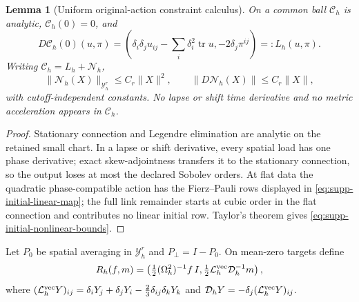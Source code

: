 \documentclass[11pt]{article}
\numberwithin{equation}{section}
\newtheorem{lemma}[lemma]{Lemma}
\theoremstyle{definition}
\theoremstyle{remark}
\newcommand{\tr}{\operatorname{tr}}
\begin{document}
\begin{lemma}[Uniform original-action constraint calculus]
\label{lem:supp-initial-calculus}
On a common ball $\mathscr C_h$ is analytic, $\mathscr C_h(0)=0$, and
\begin{equation}
 D\mathscr C_h(0)(u,\pi)=
 \left(\delta_i\delta_j u_{ij}-\sum_i\delta_i^2\tr u,
                         -2\delta_j\pi^{ij}\right)=:L_h(u,\pi).
 \label{eq:supp-initial-linear-map}
\end{equation}
Writing $\mathscr C_h=L_h+\mathscr N_h$,
\begin{equation}
 \|\mathscr N_h(X)\|_{\mathcal Y_h^r}\le C_r\|X\|^2,
 \qquad \|D\mathscr N_h(X)\|\le C_r\|X\|,
 \label{eq:supp-initial-nonlinear-bounds}
\end{equation}
with cutoff-independent constants.  No lapse or shift time derivative and no
metric acceleration appears in $\mathscr C_h$.
\end{lemma}
\begin{proof}
Stationary connection and Legendre elimination are analytic on the retained
small chart.  In a lapse or shift derivative, every spatial load has one phase
derivative; exact skew-adjointness transfers it to the stationary connection,
so the output loses at most the declared Sobolev orders.  At flat data the
quadratic phase-compatible action has the Fierz--Pauli rows displayed in
\eqref{eq:supp-initial-linear-map}; the full link remainder starts at cubic
order in the flat connection and contributes no linear initial row.  Taylor's
theorem gives \eqref{eq:supp-initial-nonlinear-bounds}.
\end{proof}

Let $P_0$ be spatial averaging in $\mathcal Y_h^r$ and
$P_\perp=I-P_0$.  On mean-zero targets define
\begin{equation}
 R_h(f,m)=\left(\tfrac12(\Omega_h^2)^{-1}f\,I,
  \tfrac12\mathcal L_h^{\rm vec}\mathcal D_h^{-1}m\right),
 \label{eq:supp-initial-right-inverse}
\end{equation}
where
$(\mathcal L_h^{\rm vec}Y)_{ij}=\delta_iY_j+\delta_jY_i
 -\frac23\delta_{ij}\delta_kY_k$ and
$\mathcal D_hY=-\delta_j(\mathcal L_h^{\rm vec}Y)_{ij}$.
\end{document}
